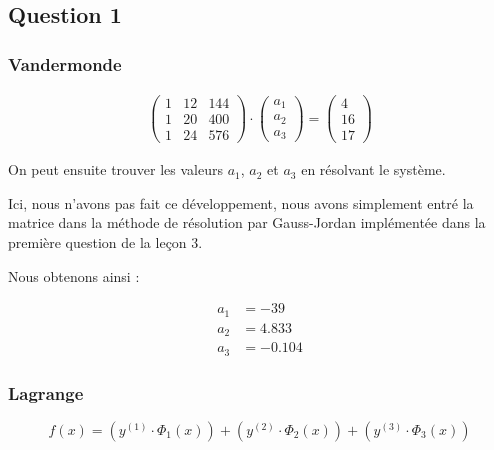 \subsection{Question 1}

\subsubsection{Vandermonde}

\begin{equation}
	\begin{aligned}
		\begin{pmatrix}
			1 & 12 & 144\\
			1 & 20 & 400\\
			1 & 24 & 576
		\end{pmatrix}
		\cdot
		\begin{pmatrix}
			a_1\\
			a_2\\
			a_3
		\end{pmatrix}=
		\begin{pmatrix}
			4\\
			16\\
			17
		\end{pmatrix}
	\end{aligned}
\end{equation}

On peut ensuite trouver les valeurs $a_1$, $a_2$ et $a_3$ en résolvant le système.

Ici, nous n'avons pas fait ce développement, nous avons simplement entré la matrice dans la méthode de résolution par Gauss-Jordan implémentée dans la première question de la leçon 3.

Nous obtenons ainsi :

\begin{equation}
	\begin{aligned}
		a_1 &= -39\\
		a_2 &= 4.833\\
		a_3 &= -0.104
	\end{aligned}
\end{equation}

\subsubsection{Lagrange}

\begin{equation}
	f(x) = (y^{(1)} \cdot \Phi_1(x)) + (y^{(2)} \cdot \Phi_2(x)) + (y^{(3)} \cdot \Phi_3(x))
\end{equation}

